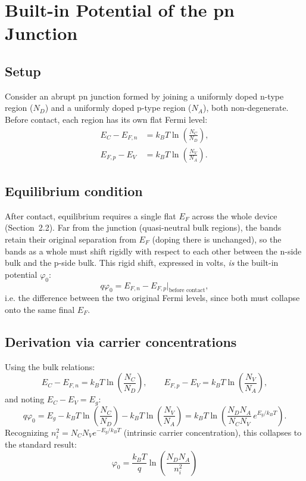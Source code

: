 \documentclass[11pt]{article}
\begin{document}
\section{Built-in Potential of the pn Junction}

\subsection{Setup}
Consider an abrupt pn junction formed by joining a uniformly doped n-type region ($N_D$) and a uniformly doped p-type region ($N_A$), both non-degenerate. Before contact, each region has its own flat Fermi level:
\begin{align}
E_C - E_{F,n} &= k_BT \ln\!\left(\frac{N_C}{N_D}\right), \\
E_{F,p} - E_V &= k_BT \ln\!\left(\frac{N_V}{N_A}\right).
\end{align}

\subsection{Equilibrium condition}
After contact, equilibrium requires a single flat $E_F$ across the whole device (Section~2.2). Far from the junction (quasi-neutral bulk regions), the bands retain their original separation from $E_F$ (doping there is unchanged), so the bands as a whole must shift rigidly with respect to each other between the n-side bulk and the p-side bulk. This rigid shift, expressed in volts, \emph{is} the built-in potential $\varphi_0$:
\begin{equation}
q\varphi_0 = E_{F,n} - E_{F,p}\Big|_{\text{before contact}},
\end{equation}
i.e. the difference between the two original Fermi levels, since both must collapse onto the same final $E_F$.

\subsection{Derivation via carrier concentrations}
Using the bulk relations:
\begin{equation}
E_C - E_{F,n} = k_BT \ln\!\left(\frac{N_C}{N_D}\right), \qquad
E_{F,p} - E_V = k_BT \ln\!\left(\frac{N_V}{N_A}\right),
\end{equation}
and noting $E_C - E_V = E_g$:
\begin{equation}
q\varphi_0 = E_g - k_BT\ln\!\left(\frac{N_C}{N_D}\right) - k_BT\ln\!\left(\frac{N_V}{N_A}\right)
= k_BT \ln\!\left(\frac{N_D N_A}{N_C N_V}\,e^{E_g/k_BT}\right).
\end{equation}
Recognizing $n_i^2 = N_C N_V e^{-E_g/k_BT}$ (intrinsic carrier concentration), this collapses to the standard result:
\begin{equation}
\boxed{\varphi_0 = \frac{k_BT}{q}\ln\!\left(\frac{N_D N_A}{n_i^2}\right)}
\end{equation}
\end{document}
